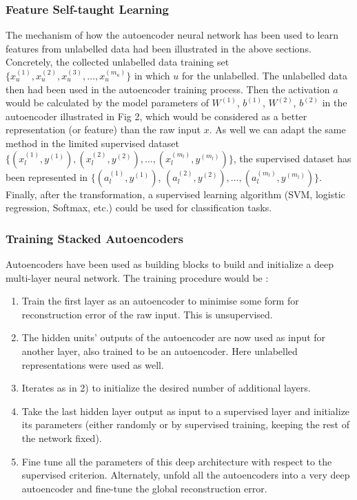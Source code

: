 \documentclass[journal]{IEEEtran}
\begin{document}
\subsubsection{Feature Self-taught Learning}
The mechanism of how the autoencoder neural network has been used to learn features from unlabelled data had been illustrated in the above sections. Concretely, the collected unlabelled data training set $\{{x_u^{(1)}, x_u^{(2)}, x_u^{(3)}, \ldots, x_u^{(m_u)} }\}$ in which $u$ for the unlabelled. The unlabelled data then had been used in the autoencoder training process. Then the activation $a$ would be calculated by the model parameters of $W^{(1)}$, $b^{(1)}$, $W^{(2)}$, $b^{(2)}$ in the autoencoder illustrated in Fig 2, which would be considered as a better representation (or feature) than the raw input $x$. As well we can adapt the same method in the limited supervised dataset $\{(x_l^{(1)}, y^{(1)}), (x_l^{(2)}, y^{(2)}), \ldots, (x_l^{(m_l)}, y^{(m_l)})\}$,  the supervised dataset has been represented in $\{(a_l^{(1)}, y^{(1)})$, $(a_l^{(2)}, y^{(2)}), \ldots, (a_l^{(m_l)}, y^{(m_l)}) \}$. Finally, after the transformation, a supervised learning algorithm (SVM, logistic regression, Softmax, etc.) could be used for classification tasks. 

\subsubsection{Training Stacked Autoencoders}
Autoencoders have been used as building blocks to build and initialize a deep multi-layer neural network. The training procedure would be \cite{bengio2009}:
\begin{enumerate}
\item Train the first layer as an autoencoder to minimise some form for reconstruction error of the raw input. This is unsupervised.
\item The hidden units' outputs of the autoencoder are now used as input for another layer, also trained to be an autoencoder. Here unlabelled representations were used as well.
\item Iterates as in 2) to initialize the desired number of additional layers.
\item Take the last hidden layer output as input to a supervised layer and initialize its parameters (either randomly or by supervised training, keeping the rest of the network fixed).
\item Fine tune all the parameters of this deep architecture with respect to the supervised criterion. Alternately, unfold all the autoencoders into a very deep autoencoder and fine-tune the global reconstruction error.
\end{enumerate}
\end{document}

